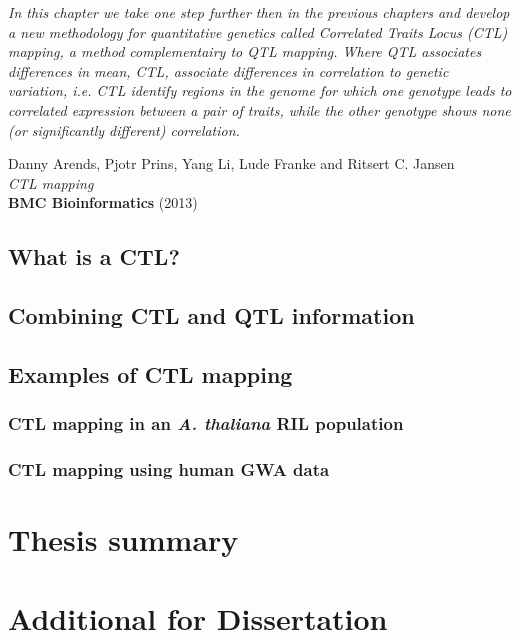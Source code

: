 \documentclass[8pt, twoside, a5paper]{report}
\newenvironment{myexampleblock}[1]{%
    \tcolorbox[beamer,%
    noparskip,breakable,
    colback=LightGreen,colframe=DarkGreen,%
    colbacklower=LimeGreen!75!LightGreen,%
    title=#1]}%
    {\endtcolorbox}
\newcommand{\authors}[1]{\small{#1}}
\newcommand{\bold}[1]{{\bfseries #1}}
\begin{document}
\emph{In this chapter we take one step further then in the previous chapters and develop a new methodology for
quantitative genetics called Correlated Traits Locus (CTL) mapping, a method complementairy to QTL mapping. 
Where QTL associates differences in mean, CTL, associate differences in correlation to genetic variation, i.e. 
CTL identify regions in the genome for which one genotype leads to correlated expression between a pair of 
traits, while the other genotype shows none (or significantly different) correlation.}

\null
\vfill

\begin{myexampleblock}{In press:}
  \authors{Danny Arends, Pjotr Prins, Yang Li, Lude Franke and Ritsert C. Jansen}\\
  \emph{CTL mapping}\\
  \bold{BMC Bioinformatics} (2013)
\end{myexampleblock}

\newpage

\section{What is a CTL?}
\lipsum[1]

\section{Combining CTL and QTL information}
\lipsum

\section{Examples of CTL mapping}
\lipsum
\subsection{CTL mapping in an \emph{A. thaliana} RIL population}

\subsection{CTL mapping using human GWA data}

\chapter{Thesis summary}
\lipsum[1-3]

\chapter{Additional for Dissertation}
\end{document}
